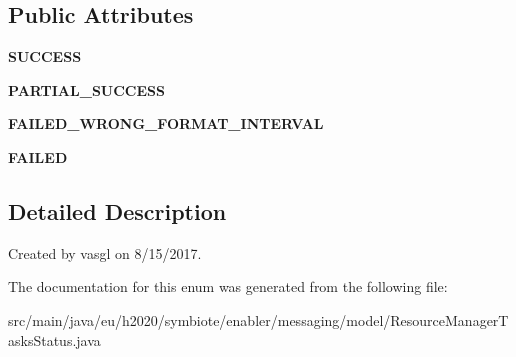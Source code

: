 \subsection*{Public Attributes}
\begin{DoxyCompactItemize}
\item 
\mbox{\label{enumeu_1_1h2020_1_1symbiote_1_1enabler_1_1messaging_1_1model_1_1ResourceManagerTasksStatus_a117a96a2ad0af0d172c5fc7d68732263}} 
{\bfseries S\+U\+C\+C\+E\+SS}
\item 
\mbox{\label{enumeu_1_1h2020_1_1symbiote_1_1enabler_1_1messaging_1_1model_1_1ResourceManagerTasksStatus_a504c8523483bec3142a2f0d8dd9ad80d}} 
{\bfseries P\+A\+R\+T\+I\+A\+L\+\_\+\+S\+U\+C\+C\+E\+SS}
\item 
\mbox{\label{enumeu_1_1h2020_1_1symbiote_1_1enabler_1_1messaging_1_1model_1_1ResourceManagerTasksStatus_a7cd0b5f396fe3f329b17dca36790ac47}} 
{\bfseries F\+A\+I\+L\+E\+D\+\_\+\+W\+R\+O\+N\+G\+\_\+\+F\+O\+R\+M\+A\+T\+\_\+\+I\+N\+T\+E\+R\+V\+AL}
\item 
\mbox{\label{enumeu_1_1h2020_1_1symbiote_1_1enabler_1_1messaging_1_1model_1_1ResourceManagerTasksStatus_ac599a12b6257888eedecba3281ffc290}} 
{\bfseries F\+A\+I\+L\+ED}
\end{DoxyCompactItemize}


\subsection{Detailed Description}
Created by vasgl on 8/15/2017. 

The documentation for this enum was generated from the following file\+:\begin{DoxyCompactItemize}
\item 
src/main/java/eu/h2020/symbiote/enabler/messaging/model/Resource\+Manager\+Tasks\+Status.\+java\end{DoxyCompactItemize}
